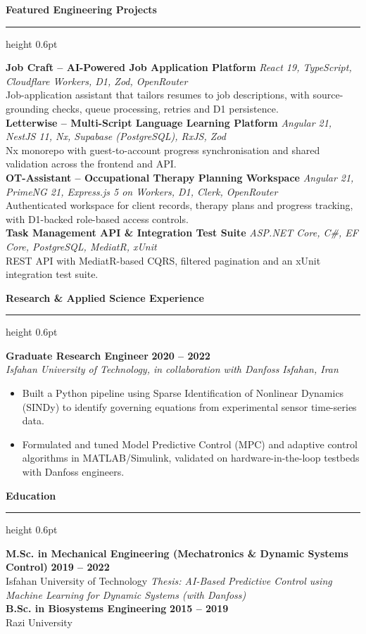 \documentclass[a4paper,10pt]{article}
\newcommand{\sectionheader}[1]{%
  \vspace{6pt}%
  {\large\bfseries\color{primarycolor} #1}%
  \vspace{2pt}\hrule height 0.6pt\vspace{4pt}%
}
\newcommand{\jobheader}[4]{%
  \textbf{#1} \hfill \textbf{#2} \\%
  \textit{\color{primarycolor}#3} \hfill \textit{#4}\\%
}
\newcommand{\projectheader}[2]{%
  \textbf{#1} \hfill {\footnotesize\textit{#2}}\\%
}
\newenvironment{tightitems}{\begin{itemize}[leftmargin=12pt, itemsep=1pt, parsep=0pt, topsep=2pt]}{\end{itemize}}
\begin{document}
\sectionheader{Featured Engineering Projects}
\projectheader{Job Craft -- AI-Powered Job Application Platform}{React 19, TypeScript, Cloudflare Workers, D1, Zod, OpenRouter}
Job-application assistant that tailors resumes to job descriptions, with source-grounding checks, queue processing, retries and D1 persistence. \\[2pt]
\projectheader{Letterwise -- Multi-Script Language Learning Platform}{Angular 21, NestJS 11, Nx, Supabase (PostgreSQL), RxJS, Zod}
Nx monorepo with guest-to-account progress synchronisation and shared validation across the frontend and API. \\[2pt]
\projectheader{OT-Assistant -- Occupational Therapy Planning Workspace}{Angular 21, PrimeNG 21, Express.js 5 on Workers, D1, Clerk, OpenRouter}
Authenticated workspace for client records, therapy plans and progress tracking, with D1-backed role-based access controls. \\[2pt]
\projectheader{Task Management API \& Integration Test Suite}{ASP.NET Core, C\#, EF Core, PostgreSQL, MediatR, xUnit}
REST API with MediatR-based CQRS, filtered pagination and an xUnit integration test suite.

\sectionheader{Research \& Applied Science Experience}
\jobheader{Graduate Research Engineer}{2020 -- 2022}{Isfahan University of Technology, in collaboration with Danfoss}{Isfahan, Iran}
\begin{tightitems}
    \item Built a Python pipeline using Sparse Identification of Nonlinear Dynamics (SINDy) to identify governing equations from experimental sensor time-series data.
    \item Formulated and tuned Model Predictive Control (MPC) and adaptive control algorithms in MATLAB/Simulink, validated on hardware-in-the-loop testbeds with Danfoss engineers.
\end{tightitems}

\sectionheader{Education}
\textbf{M.Sc. in Mechanical Engineering (Mechatronics \& Dynamic Systems Control)} \hfill \textbf{2019 -- 2022} \\
Isfahan University of Technology \hfill \textit{Thesis: AI-Based Predictive Control using Machine Learning for Dynamic Systems (with Danfoss)} \\[2pt]
\textbf{B.Sc. in Biosystems Engineering} \hfill \textbf{2015 -- 2019} \\
Razi University
\end{document}
